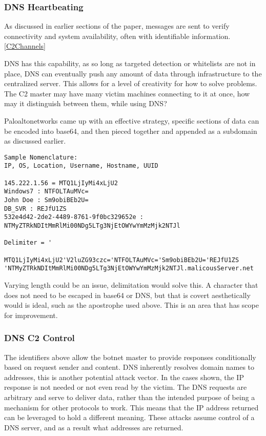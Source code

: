\subsubsection{DNS Heartbeating}\label{DNSHeartbeat}
As discussed in earlier sections of the paper, messages are sent to verify connectivity and system availability, often with identifiable information. \ref{C2Channels}

DNS has this capability, as so long as targeted detection or whitelists are not in place, DNS can eventually push any amount of data through infrastructure to the centralized server. This allows for a level of creativity for how to solve problems.
The C2 master may have many victim machines connecting to it at once, how may it distinguish between them, while using DNS?

Paloaltonetworks came up with an effective strategy, specific sections of data can be encoded into base64, and then pieced together and appended as a subdomain as discussed earlier. \citep{DNSTunneling}

\begin{lstlisting}[label=HostEncoding,caption=Encoding Of Identifiers Into A DNS Request]
Sample Nomenclature:
IP, OS, Location, Username, Hostname, UUID

145.222.1.56 = MTQ1LjIyMi4xLjU2
Windows7 : NTFOLTAuMVc=
John Doe : Sm9obiBEb2U=
DB_SVR : REJfU1ZS
532e4d42-2de2-4489-8761-9f0bc329652e :
NTMyZTRkNDItMmRlMi00NDg5LTg3NjEtOWYwYmMzMjk2NTJl

Delimiter = '

MTQ1LjIyMi4xLjU2'V2luZG93czc='NTFOLTAuMVc='Sm9obiBEb2U='REJfU1ZS
'NTMyZTRkNDItMmRlMi00NDg5LTg3NjEtOWYwYmMzMjk2NTJl.malicousServer.net
\end{lstlisting}

Varying length could be an issue, delimitation would solve this. A character that does not need to be escaped in base64 or DNS, but that is covert aesthetically would is ideal, such as the apostrophe used above. 
This is an area that has scope for improvement.

\subsubsection{DNS C2 Control}\label{DNSControl}
The identifiers above allow the botnet master to provide responses conditionally based on request sender and content. DNS inherently resolves domain names to addresses, this is another potential attack vector.
In the cases shown, the IP response is not needed or not even read by the victim. The DNS requests are arbitrary and serve to deliver data, rather than the intended purpose of being a mechanism for other protocols to work.
This means that the IP address returned can be leveraged to hold a different meaning. These attacks assume control of a DNS server, and as a result what addresses are returned. \citep{DNSTunneling}

